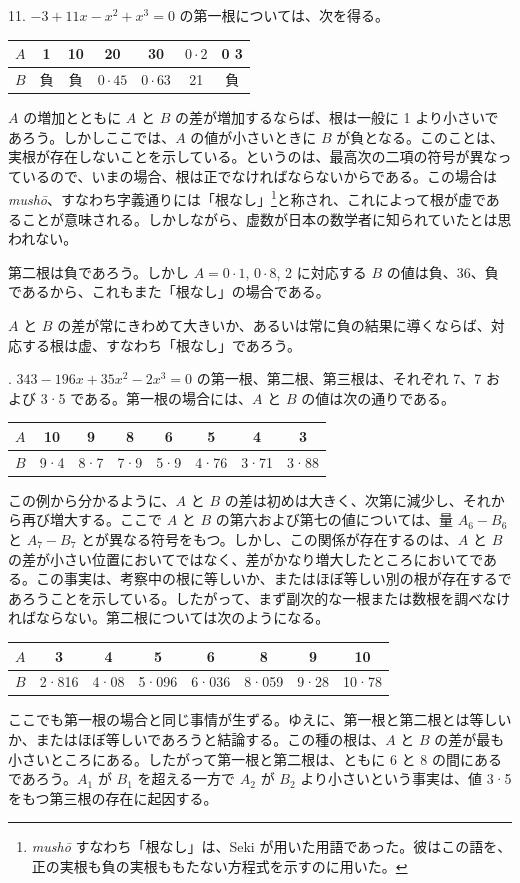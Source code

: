 \documentclass[11pt]{article}
\newcommand{\scanpage}[2]{\clearpage\setcounter{footnote}{0}\noindent{\footnotesize\color{gray}PDF #1 頁 · #2}\par\medskip}
\begin{document}
11. $-3 + 11x - x^2 + x^3 = 0$ の第一根については、次を得る。
\begin{center}
\begin{tabular}{c|c|c|c|c|c|c}
$A$ & 1 & 10 & 20 & 30 & $0{\cdot}2$ & 0 3\\
\hline
$B$ & 負 & 負 & $0{\cdot}45$ & $0{\cdot}63$ & 21 & 負
\end{tabular}
\end{center}
\noindent $A$ の増加とともに $A$ と $B$ の差が増加するならば、根は一般に 1 より小さいであろう。しかしここでは、$A$ の値が小さいときに $B$ が負となる。このことは、実根が存在しないことを示している。というのは、最高次の二項の符号が異なっているので、いまの場合、根は正でなければならないからである。この場合は \emph{mushō}、すなわち字義通りには「根なし」\footnote{\emph{mushō} すなわち「根なし」は、Seki が用いた用語であった。彼はこの語を、正の実根も負の実根ももたない方程式を示すのに用いた。}と称され、これによって根が虚であることが意味される。しかしながら、虚数が日本の数学者に知られていたとは思われない。

第二根は負であろう。しかし $A = 0{\cdot}1$, $0{\cdot}8$, 2 に対応する $B$ の値は負、36、負であるから、これもまた「根なし」の場合である。

$A$ と $B$ の差が常にきわめて大きいか、あるいは常に負の結果に導くならば、対応する根は虚、すなわち「根なし」であろう。

\scanpage{0280}{印刷頁 266}
12. $343 - 196x + 35x^2 - 2x^3 = 0$ の第一根、第二根、第三根は、それぞれ 7、7 および 3·5 である。第一根の場合には、$A$ と $B$ の値は次の通りである。
\begin{center}
\begin{tabular}{c|c|c|c|c|c|c|c}
$A$ & 10 & 9 & 8 & 6 & 5 & 4 & 3 \\
\hline
$B$ & 9·4 & 8·7 & 7·9 & 5·9 & 4·76 & 3·71 & 3·88
\end{tabular}
\end{center}

この例から分かるように、$A$ と $B$ の差は初めは大きく、次第に減少し、それから再び増大する。ここで $A$ と $B$ の第六および第七の値については、量 $A_6 - B_6$ と $A_7 - B_7$ とが異なる符号をもつ。しかし、この関係が存在するのは、$A$ と $B$ の差が小さい位置においてではなく、差がかなり増大したところにおいてである。この事実は、考察中の根に等しいか、またはほぼ等しい別の根が存在するであろうことを示している。したがって、まず副次的な一根または数根を調べなければならない。第二根については次のようになる。
\begin{center}
\begin{tabular}{c|c|c|c|c|c|c|c}
$A$ & 3 & 4 & 5 & 6 & 8 & 9 & 10 \\
\hline
$B$ & 2·816 & 4·08 & 5·096 & 6·036 & 8·059 & 9·28 & 10·78
\end{tabular}
\end{center}
ここでも第一根の場合と同じ事情が生ずる。ゆえに、第一根と第二根とは等しいか、またはほぼ等しいであろうと結論する。この種の根は、$A$ と $B$ の差が最も小さいところにある。したがって第一根と第二根は、ともに 6 と 8 の間にあるであろう。$A_1$ が $B_1$ を超える一方で $A_2$ が $B_2$ より小さいという事実は、値 3·5 をもつ第三根の存在に起因する。
\end{document}
